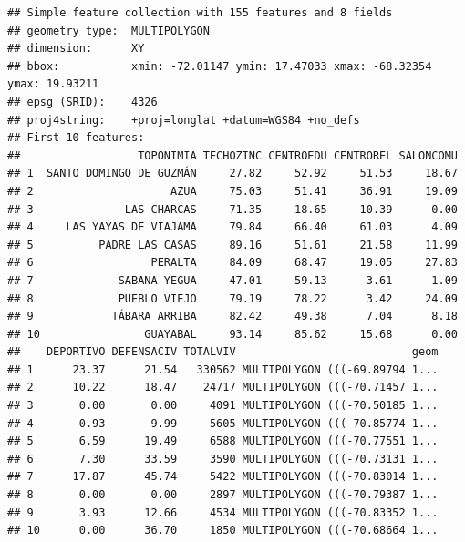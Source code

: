 \documentclass[11pt,]{article}
\newenvironment{Shaded}{\begin{snugshade}}{\end{snugshade}}
\newcommand{\KeywordTok}[1]{\textcolor[rgb]{0.13,0.29,0.53}{\textbf{#1}}}
\newcommand{\DataTypeTok}[1]{\textcolor[rgb]{0.13,0.29,0.53}{#1}}
\newcommand{\DecValTok}[1]{\textcolor[rgb]{0.00,0.00,0.81}{#1}}
\newcommand{\StringTok}[1]{\textcolor[rgb]{0.31,0.60,0.02}{#1}}
\newcommand{\OperatorTok}[1]{\textcolor[rgb]{0.81,0.36,0.00}{\textbf{#1}}}
\newcommand{\NormalTok}[1]{#1}
\begin{document}
\begin{verbatim}
## Simple feature collection with 155 features and 8 fields
## geometry type:  MULTIPOLYGON
## dimension:      XY
## bbox:           xmin: -72.01147 ymin: 17.47033 xmax: -68.32354 ymax: 19.93211
## epsg (SRID):    4326
## proj4string:    +proj=longlat +datum=WGS84 +no_defs
## First 10 features:
##                  TOPONIMIA TECHOZINC CENTROEDU CENTROREL SALONCOMU
## 1  SANTO DOMINGO DE GUZMÁN     27.82     52.92     51.53     18.67
## 2                     AZUA     75.03     51.41     36.91     19.09
## 3              LAS CHARCAS     71.35     18.65     10.39      0.00
## 4     LAS YAYAS DE VIAJAMA     79.84     66.40     61.03      4.09
## 5          PADRE LAS CASAS     89.16     51.61     21.58     11.99
## 6                  PERALTA     84.09     68.47     19.05     27.83
## 7             SABANA YEGUA     47.01     59.13      3.61      1.09
## 8             PUEBLO VIEJO     79.19     78.22      3.42     24.09
## 9            TÁBARA ARRIBA     82.42     49.38      7.04      8.18
## 10                GUAYABAL     93.14     85.62     15.68      0.00
##    DEPORTIVO DEFENSACIV TOTALVIV                           geom
## 1      23.37      21.54   330562 MULTIPOLYGON (((-69.89794 1...
## 2      10.22      18.47    24717 MULTIPOLYGON (((-70.71457 1...
## 3       0.00       0.00     4091 MULTIPOLYGON (((-70.50185 1...
## 4       0.93       9.99     5605 MULTIPOLYGON (((-70.85774 1...
## 5       6.59      19.49     6588 MULTIPOLYGON (((-70.77551 1...
## 6       7.30      33.59     3590 MULTIPOLYGON (((-70.73131 1...
## 7      17.87      45.74     5422 MULTIPOLYGON (((-70.83014 1...
## 8       0.00       0.00     2897 MULTIPOLYGON (((-70.79387 1...
## 9       3.93      12.66     4534 MULTIPOLYGON (((-70.83352 1...
## 10      0.00      36.70     1850 MULTIPOLYGON (((-70.68664 1...
\end{verbatim}

\begin{Shaded}
\end{Shaded}
\end{document}
